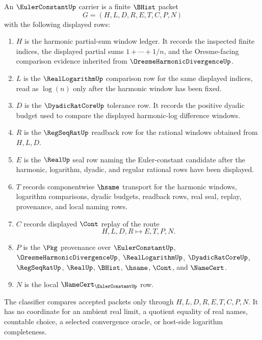 \begin{definition}
\label{def:euler-constant-carrier}
An $\EulerConstantUp$ carrier is a finite $\BHist$ packet
$$
G=(H,L,D,R,E,T,C,P,N)
$$
with the following displayed rows:
\begin{enumerate}
\item $H$ is the harmonic partial-sum window ledger. It records the inspected finite indices, the displayed partial sums $1+\cdots+1/n$, and the Oresme-facing comparison evidence inherited from $\OresmeHarmonicDivergenceUp$.
\item $L$ is the $\RealLogarithmUp$ comparison row for the same displayed indices, read as $\log(n)$ only after the harmonic window has been fixed.
\item $D$ is the $\DyadicRatCoreUp$ tolerance row. It records the positive dyadic budget used to compare the displayed harmonic-log difference windows.
\item $R$ is the $\RegSeqRatUp$ readback row for the rational windows obtained from $H,L,D$.
\item $E$ is the $\RealUp$ seal row naming the Euler-constant candidate after the harmonic, logarithm, dyadic, and regular rational rows have been displayed.
\item $T$ records componentwise $\hsame$ transport for the harmonic windows, logarithm comparisons, dyadic budgets, readback rows, real seal, replay, provenance, and local naming rows.
\item $C$ records displayed $\Cont$ replay of the route
$$
H,L,D,R \longmapsto E,T,P,N .
$$
\item $P$ is the $\Pkg$ provenance over $\EulerConstantUp$, $\OresmeHarmonicDivergenceUp$, $\RealLogarithmUp$, $\DyadicRatCoreUp$, $\RegSeqRatUp$, $\RealUp$, $\BHist$, $\hsame$, $\Cont$, and $\NameCert$.
\item $N$ is the local $\NameCert_{\EulerConstantUp}$ row.
\end{enumerate}
The classifier compares accepted packets only through $H,L,D,R,E,T,C,P,N$. It has no coordinate for an ambient real limit, a quotient equality of real names, countable choice, a selected convergence oracle, or host-side logarithm completeness.
\end{definition}

